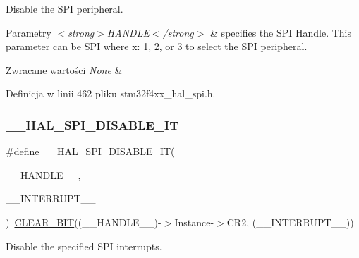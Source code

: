 Disable the S\+PI peripheral. 


\begin{DoxyParams}{Parametry}
{\em $<$strong$>$\+H\+A\+N\+D\+L\+E$<$/strong$>$} & specifies the S\+PI Handle. This parameter can be S\+PI where x\+: 1, 2, or 3 to select the S\+PI peripheral. \\
\hline
\end{DoxyParams}

\begin{DoxyRetVals}{Zwracane wartości}
{\em None} & \\
\hline
\end{DoxyRetVals}


Definicja w linii 462 pliku stm32f4xx\+\_\+hal\+\_\+spi.\+h.

\mbox{\label{group___s_p_i___exported___macros_ga47fa7321c5755bfbff1a7229fbe5b21c}} 
\subsubsection{\texorpdfstring{\+\_\+\+\_\+\+H\+A\+L\+\_\+\+S\+P\+I\+\_\+\+D\+I\+S\+A\+B\+L\+E\+\_\+\+IT}{\_\_HAL\_SPI\_DISABLE\_IT}}
{\footnotesize\ttfamily \#define \+\_\+\+\_\+\+H\+A\+L\+\_\+\+S\+P\+I\+\_\+\+D\+I\+S\+A\+B\+L\+E\+\_\+\+IT(\begin{DoxyParamCaption}\item[{}]{\+\_\+\+\_\+\+H\+A\+N\+D\+L\+E\+\_\+\+\_\+,  }\item[{}]{\+\_\+\+\_\+\+I\+N\+T\+E\+R\+R\+U\+P\+T\+\_\+\+\_\+ }\end{DoxyParamCaption})~\hyperlink{group___exported__macro_ga133aae6fc0d41bffab39ab223a7001de}{C\+L\+E\+A\+R\+\_\+\+B\+IT}((\+\_\+\+\_\+\+H\+A\+N\+D\+L\+E\+\_\+\+\_\+)-\/$>$Instance-\/$>$C\+R2, (\+\_\+\+\_\+\+I\+N\+T\+E\+R\+R\+U\+P\+T\+\_\+\+\_\+))}



Disable the specified S\+PI interrupts. 


